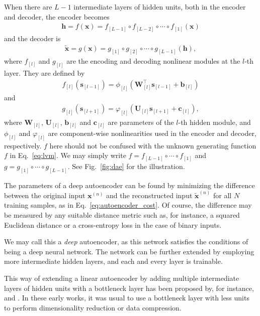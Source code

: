 \documentclass[dissertation,nocontribution,draft*]{aaltoseries}
\newcommand{\qlay}[1]{\left[#1\right]}
\newcommand{\vect}[1]{\mathbf{#1}}
\newcommand{\matr}[1]{\mathbf{#1}}
\newcommand{\vb}[0]{\vect{b}}
\newcommand{\vc}[0]{\vect{c}}
\newcommand{\vh}[0]{\vect{h}}
\newcommand{\vx}[0]{\vect{x}}
\newcommand{\vs}[0]{\vect{s}}
\newcommand{\mW}[0]{\matr{W}}
\newcommand{\mU}[0]{\matr{U}}
\begin{document}
When there are $L-1$ intermediate layers of hidden units,
both in the encoder and decoder, the encoder becomes
\begin{align}
    \label{eq:ae_encoder}
    \vh = f(\vx) = f_{
    \qlay{L-1}} \circ f_{\qlay{L-2}} \circ \cdots \circ
    f_{\qlay{1}}(\vx)
\end{align}
and the decoder is
\begin{align}
    \label{eq:ae_decoder}
    \tilde{\vx} = g(\vx) = g_{\qlay{1}} \circ g_{\qlay{2}} \circ \cdots \circ
    g_{\qlay{L-1}} (\vh),
\end{align}
where $f_{\qlay{l}}$ and $g_{\qlay{l}}$ are the encoding and decoding
nonlinear modules at the $l$-th layer. They are
defined by
\begin{align*}
    f_{\qlay{l}}(\vs_{\qlay{l-1}}) = \phi_{\qlay{l}}
    \left(\mW_{\qlay{l}}^\top \vs_{\qlay{l-1}} +
    \vb_{\qlay{l}}\right)
\end{align*}
and
\begin{align*}
    g_{\qlay{l}}(\vs_{\qlay{l+1}}) = \varphi_{\qlay{l}}
    \left(\mU_{\qlay{l}} \vs_{\qlay{l+1}} + \vc_{\qlay{l}}
    \right),
\end{align*}
where $\mW_{\qlay{l}}$, $\mU_{\qlay{l}}$, $\vb_{\qlay{l}}$
and $\vc_{\qlay{l}}$ are parameters
of the $l$-th hidden module, and $\phi_{\qlay{l}}$ and
$\varphi_{\qlay{l}}$
are component-wise nonlinearities used in the encoder and
decoder, respectively.  $f$ here should not be confused with
the unknown generating function $f$ in Eq.~\eqref{eq:lvm}.
We may simply write $f = f_{\qlay{L-1}} \circ \cdots \circ
f_{\qlay{1}}$ and
$g = g_{\qlay{1}} \circ \cdots \circ g_{\qlay{L-1}}$. See Fig.~\ref{fig:dae}
for the illustration.

The parameters of a deep autoencoder can be found by
minimizing the difference between the original input
$\vx^{(n)}$ and the reconstructed input $\tilde{\vx}^{(n)}$
for all $N$ training samples, as in
Eq.~\eqref{eq:autoencoder_cost}. Of course, the difference
may be measured by any suitable distance metric such as, for
instance, a squared Euclidean distance or a cross-entropy
loss in the case of binary inputs.

We may call this a \textit{deep} autoencoder, as this
network satisfies the conditions of being a deep neural
network. The network can be further extended by employing
more intermediate hidden layers, and each and every layer is
trainable.

This way of extending a linear autoencoder by adding
multiple intermediate layers of hidden units with a
bottleneck layer has been proposed by, for instance,
\citet{Oja1991} and \citet{Kramer1991}. In these early
works, it was usual to use a bottleneck layer with less
units to perform 
dimensionality reduction or data compression.
\end{document}
